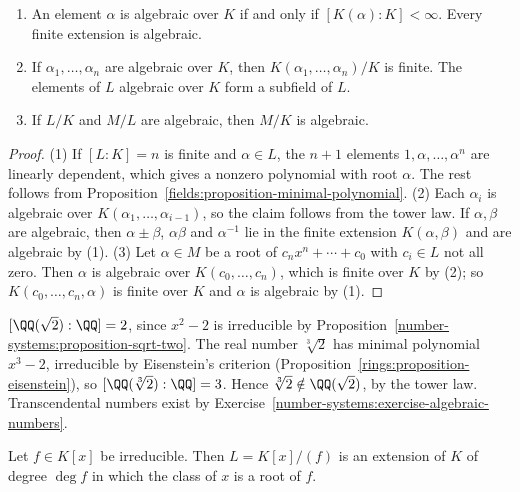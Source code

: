 \begin{proposition}\label{fields:proposition-algebraic-closure-in-extension}
\begin{enumerate}
\item An element $\alpha$ is algebraic over $K$ if and only if $[K(\alpha) : K] < \infty$.
Every finite extension is algebraic.
\item If $\alpha_1, \ldots, \alpha_n$ are algebraic over $K$, then $K(\alpha_1, \ldots, \alpha_n)/K$ is
finite. The elements of $L$ algebraic over $K$ form a subfield of $L$.
\item If $L/K$ and $M/L$ are algebraic, then $M/K$ is algebraic.
\end{enumerate}
\end{proposition}

\begin{proof}
(1) If $[L : K] = n$ is finite and $\alpha \in L$, the $n + 1$ elements $1, \alpha, \ldots, \alpha^n$ are
linearly dependent, which gives a nonzero polynomial with root $\alpha$. The rest follows
from Proposition~\ref{fields:proposition-minimal-polynomial}.
(2) Each $\alpha_i$ is algebraic over $K(\alpha_1, \ldots, \alpha_{i-1})$, so the claim follows from the
tower law. If $\alpha, \beta$ are algebraic, then $\alpha \pm \beta$, $\alpha\beta$ and $\alpha^{-1}$ lie in the
finite extension $K(\alpha, \beta)$ and are algebraic by (1).
(3) Let $\alpha \in M$ be a root of $c_nx^n + \cdots + c_0$ with $c_i \in L$ not all zero. Then $\alpha$ is
algebraic over $K(c_0, \ldots, c_n)$, which is finite over $K$ by (2); so $K(c_0, \ldots, c_n, \alpha)$
is finite over $K$ and $\alpha$ is algebraic by (1).
\end{proof}

\begin{example}\label{fields:example-degrees}
$[\QQ(\sqrt 2) : \QQ] = 2$, since $x^2 - 2$ is irreducible by
Proposition~\ref{number-systems:proposition-sqrt-two}. The real number $\sqrt[3]{2}$ has
minimal polynomial $x^3 - 2$, irreducible by Eisenstein's criterion
(Proposition~\ref{rings:proposition-eisenstein}), so $[\QQ(\sqrt[3]{2}) : \QQ] = 3$. Hence
$\sqrt[3]{2} \notin \QQ(\sqrt 2)$, by the tower law. Transcendental numbers exist by
Exercise~\ref{number-systems:exercise-algebraic-numbers}.
\end{example}

\begin{proposition}[Kronecker]\label{fields:proposition-kronecker}
Let $f \in K[x]$ be irreducible. Then $L = K[x]/(f)$ is an extension of $K$ of degree
$\deg f$ in which the class of $x$ is a root of $f$.
\end{proposition}

